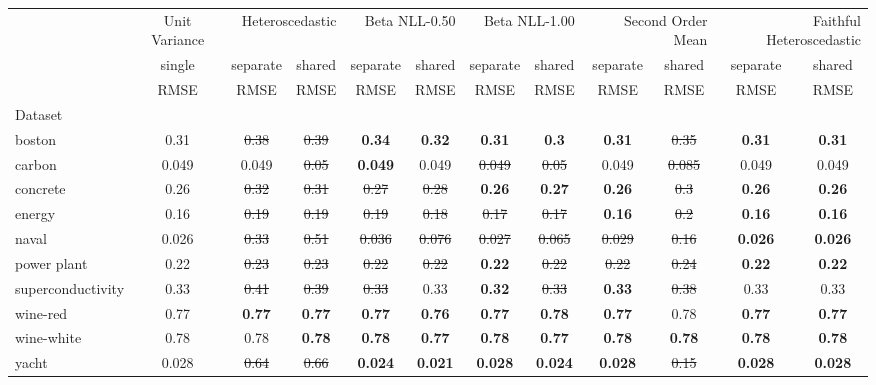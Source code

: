 \begin{tabular}{l|c|cc|cc|cc|cc|cc}
\toprule
{} & {Unit Variance} & \multicolumn{2}{r}{Heteroscedastic} & \multicolumn{2}{r}{Beta NLL-0.50} & \multicolumn{2}{r}{Beta NLL-1.00} & \multicolumn{2}{r}{Second Order Mean} & \multicolumn{2}{r}{Faithful Heteroscedastic} \\
{} & {single} & {separate} & {shared} & {separate} & {shared} & {separate} & {shared} & {separate} & {shared} & {separate} & {shared} \\
{} & {RMSE} & {RMSE} & {RMSE} & {RMSE} & {RMSE} & {RMSE} & {RMSE} & {RMSE} & {RMSE} & {RMSE} & {RMSE} \\
{Dataset} & {} & {} & {} & {} & {} & {} & {} & {} & {} & {} & {} \\
\midrule
boston & 0.31 & \sout{0.38} & \sout{0.39} & \textbf{0.34} & \textbf{0.32} & \textbf{0.31} & \textbf{0.3} & \textbf{0.31} & \sout{0.35} & \textbf{0.31} & \textbf{0.31} \\
carbon & 0.049 & 0.049 & \sout{0.05} & \textbf{0.049} & 0.049 & \sout{0.049} & \sout{0.05} & 0.049 & \sout{0.085} & 0.049 & 0.049 \\
concrete & 0.26 & \sout{0.32} & \sout{0.31} & \sout{0.27} & \sout{0.28} & \textbf{0.26} & \textbf{0.27} & \textbf{0.26} & \sout{0.3} & \textbf{0.26} & \textbf{0.26} \\
energy & 0.16 & \sout{0.19} & \sout{0.19} & \sout{0.19} & \sout{0.18} & \sout{0.17} & \sout{0.17} & \textbf{0.16} & \sout{0.2} & \textbf{0.16} & \textbf{0.16} \\
naval & 0.026 & \sout{0.33} & \sout{0.51} & \sout{0.036} & \sout{0.076} & \sout{0.027} & \sout{0.065} & \sout{0.029} & \sout{0.16} & \textbf{0.026} & \textbf{0.026} \\
power plant & 0.22 & \sout{0.23} & \sout{0.23} & \sout{0.22} & \sout{0.22} & \textbf{0.22} & \sout{0.22} & \sout{0.22} & \sout{0.24} & \textbf{0.22} & \textbf{0.22} \\
superconductivity & 0.33 & \sout{0.41} & \sout{0.39} & \sout{0.33} & 0.33 & \textbf{0.32} & \sout{0.33} & \textbf{0.33} & \sout{0.38} & 0.33 & 0.33 \\
wine-red & 0.77 & \textbf{0.77} & \textbf{0.77} & \textbf{0.77} & \textbf{0.76} & \textbf{0.77} & \textbf{0.78} & \textbf{0.77} & 0.78 & \textbf{0.77} & \textbf{0.77} \\
wine-white & 0.78 & 0.78 & \textbf{0.78} & \textbf{0.78} & \textbf{0.77} & \textbf{0.78} & \textbf{0.77} & \textbf{0.78} & \textbf{0.78} & \textbf{0.78} & \textbf{0.78} \\
yacht & 0.028 & \sout{0.64} & \sout{0.66} & \textbf{0.024} & \textbf{0.021} & \textbf{0.028} & \textbf{0.024} & \textbf{0.028} & \sout{0.15} & \textbf{0.028} & \textbf{0.028} \\
\bottomrule
\end{tabular}
